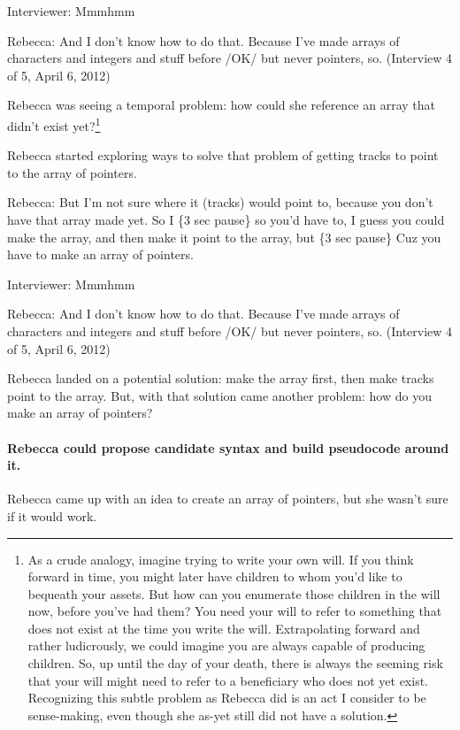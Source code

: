 Interviewer: Mmmhmm

Rebecca: And I don't know how to do that. Because I've made arrays of
characters and integers and stuff before /OK/ but never pointers, so.
(Interview 4 of 5, April 6, 2012)

Rebecca was seeing a temporal problem: how could she reference an array
that didn't exist yet?\footnote{As a crude analogy, imagine trying to
  write your own will. If you think forward in time, you might later
  have children to whom you'd like to bequeath your assets. But how can
  you enumerate those children in the will now, before you've had them?
  You need your will to refer to something that does not exist at the
  time you write the will. Extrapolating forward and rather ludicrously,
  we could imagine you are always capable of producing children. So, up
  until the day of your death, there is always the seeming risk that
  your will might need to refer to a beneficiary who does not yet exist.
  Recognizing this subtle problem as Rebecca did is an act I consider to
  be sense-making, even though she as-yet still did not have a solution.}

Rebecca started exploring ways to solve that problem of getting tracks
to point to the array of pointers.

Rebecca: But I'm not sure where it (tracks) would point to, because you
don't have that array made yet. So I \{3 sec pause\} so you'd have to, I
guess you could make the array, and then make it point to the array, but
\{3 sec pause\} Cuz you have to make an array of pointers.

Interviewer: Mmmhmm

Rebecca: And I don't know how to do that. Because I've made arrays of
characters and integers and stuff before /OK/ but never pointers, so.
(Interview 4 of 5, April 6, 2012)

Rebecca landed on a potential solution: make the array first, then make
tracks point to the array. But, with that solution came another problem:
how do you make an array of pointers?

\paragraph{Rebecca could propose candidate syntax and build pseudocode
around
it.}\label{rebecca-could-propose-candidate-syntax-and-build-pseudocode-around-it.}

Rebecca came up with an idea to create an array of pointers, but she
wasn't sure if it would work.

